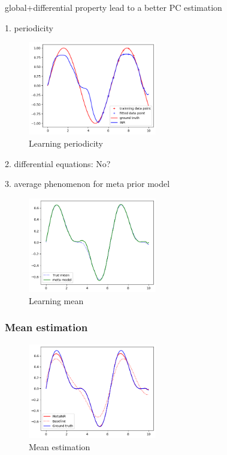 \documentclass{article}
\begin{document}
global+differential property lead to a better PC estimation



1. periodicity
\begin{figure}
  \centering
  \includegraphics[width=0.5\textwidth]{learning_periodicity.png}
  \caption{Learning periodicity}
\end{figure}

2. differential equations: No?

3. average phenomenon for meta prior model
\begin{figure}
  \centering
  \includegraphics[width=0.5\textwidth]{learning_mean.png}
  \caption{Learning mean}
\end{figure}

\subsubsection{Mean estimation}

\begin{figure}
  \centering
  \includegraphics[width=0.5\textwidth]{mean.png}
  \caption{Mean estimation}
\end{figure}
\end{document}
